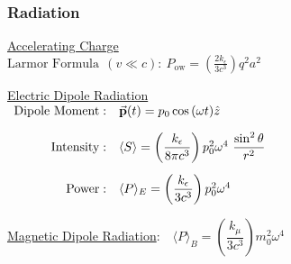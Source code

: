 \documentclass[12pt]{article}
\begin{document}
\vspace{15pt}
\begin{minipage}[t]{.43\textwidth}
	\subsubsection{Radiation}

	\vspace{5pt}\noindent
	\underline{Accelerating Charge}\\
	\(\displaystyle \text{Larmor Formula}\ \ (v \ll c):\ P_\text{ow}
		= \left(\frac{2k_\epsilon}{3c^3}\right) q^2 a^2\)

	\vspace{15pt}\noindent
	\underline{Electric Dipole Radiation}\\[10pt]
	\(\begin{array}{r l}
		\text{Dipole Moment}:	&\vec{\mathbf{p}}(t) = p_0 \cos{(\omega t)} \hat{z}\\[10pt]
		\text{Intensity}:		&\langle S \rangle 
			= \left( \dfrac{k_\epsilon}{8\pi c^3} \right) p^2_0 \omega^4\ \dfrac{\sin^2 \theta}{r^2}\\[15pt]
		\text{Power}:			&\langle P \rangle_E = \left( \dfrac{k_\epsilon}{3c^3} \right) p^2_0 \omega^4
	\end{array}\)

	\vspace{15pt}\noindent
	\underline{Magnetic Dipole Radiation}:\ \ \(\langle P \rangle_B 
		= \left(\dfrac{k_\mu}{3c^3}\right) m^2_0 \omega^4\)
\end{minipage}
\hfill
\end{document}
